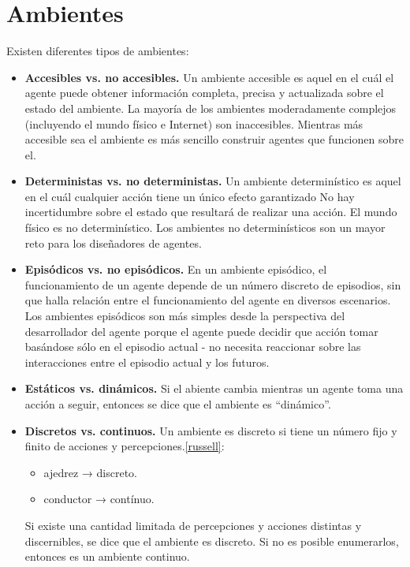 \documentclass[a4paper,12pt,oneside]{book}
\begin{document}
\section{Ambientes}
Existen diferentes tipos de ambientes:
\begin{itemize}
\item {\bf Accesibles vs. no accesibles.}
Un ambiente accesible es aquel en el cuál el agente puede
obtener información completa, precisa y actualizada sobre el
estado del ambiente. La mayoría de los ambientes
moderadamente complejos (incluyendo el mundo físico e
Internet) son inaccesibles. Mientras más accesible sea el
ambiente es más sencillo construir agentes que funcionen sobre el.

\item {\bf Deterministas vs. no deterministas.}
  Un ambiente determinístico es aquel en el cuál cualquier acción tiene un
único efecto garantizado No hay incertidumbre sobre el estado que
resultará de realizar una acción. El mundo físico es no
determinístico. Los ambientes no determinísticos son un mayor reto
para los diseñadores de agentes.

\item {\bf Episódicos vs. no episódicos.}
 En un ambiente episódico, el funcionamiento de un agente depende de
 un número discreto de episodios, sin que halla relación entre el
 funcionamiento del agente en diversos escenarios. Los ambientes episódicos son
más simples desde la perspectiva del desarrollador del agente porque
el agente puede decidir que acción tomar basándose sólo en el episodio
actual - no necesita reaccionar sobre las interacciones entre el episodio actual y los futuros.

\item {\bf Estáticos vs. dinámicos.} Si el abiente cambia mientras un
  agente toma una acción a seguir, entonces se dice que el ambiente es
  ``dinámico''. 
\item {\bf Discretos vs. continuos.}                         
Un ambiente es discreto si tiene un número fijo y finito de acciones y
percepciones.\ref{russell}:
\begin{itemize}
   \item ajedrez → discreto.
    \item conductor → contínuo.
  \end{itemize}
 Si existe una cantidad limitada de
  percepciones y acciones distintas y discernibles, se dice que el
  ambiente es discreto. Si no es posible enumerarlos, entonces es un
  ambiente continuo.
\end{itemize}
\end{document}
